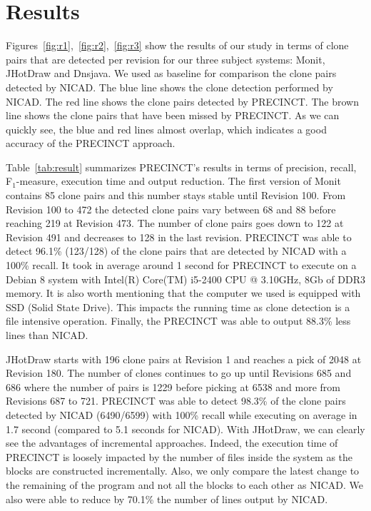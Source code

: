 

\section{Results}
\label{sub:Results}

Figures~\ref{fig:r1},~\ref{fig:r2},~\ref{fig:r3} show the results of our study in terms of clone pairs that are detected per revision for our three subject systems: Monit, JHotDraw and Dnsjava. We used as baseline for comparison the clone pairs detected by NICAD. The blue line shows the clone detection performed by NICAD. The red line shows the clone pairs detected by PRECINCT. The brown line shows the clone pairs that have been missed by PRECINCT. As we can quickly see, the blue and red lines almost overlap, which indicates a good accuracy of the PRECINCT approach.



Table~\ref{tab:result} summarizes PRECINCT's results in terms of precision, recall, F$_{1}$-measure, execution time and output reduction.
The first version of Monit contains 85 clone pairs and this number stays stable until Revision 100. From Revision 100 to 472 the detected clone pairs vary between 68 and 88 before reaching 219 at Revision 473.
The number of clone pairs goes down to 122 at Revision 491 and decreases to 128 in the last revision. PRECINCT was able to detect 96.1\% (123/128) of the clone pairs that are detected by NICAD with a 100\% recall.
It took in average around 1 second for PRECINCT to execute on a Debian 8 system with Intel(R) Core(TM) i5-2400 CPU @ 3.10GHz, 8Gb of DDR3 memory.
It is also worth mentioning that the computer we used is equipped with SSD (Solid State Drive).
This impacts the running time as clone detection is a file intensive operation.
Finally, the PRECINCT was able to output 88.3\% less lines than NICAD.

JHotDraw starts with 196 clone pairs at Revision 1 and reaches a pick of 2048 at Revision 180. The number of clones  continues to go up until Revisions 685 and 686 where the number of pairs is 1229 before picking at 6538 and more from Revisions 687 to 721.
PRECINCT was able to detect 98.3\% of the clone pairs detected by NICAD (6490/6599) with 100\% recall while executing on average in 1.7 second (compared to 5.1 seconds for NICAD).
With JHotDraw, we can clearly see the advantages of incremental approaches.
Indeed, the execution time of PRECINCT is loosely impacted by the number of files inside the system as the blocks are constructed incrementally.
Also, we only compare the latest change to the remaining of the program and not all the blocks to each other as NICAD.
We also were able to reduce by 70.1\% the number of lines output by NICAD.

